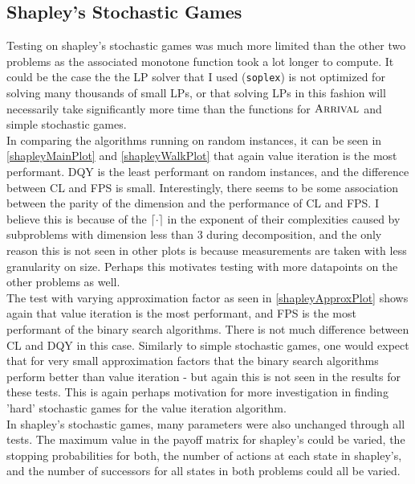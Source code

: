 \subsection{Shapley's Stochastic Games}
Testing on shapley's stochastic games was much more limited than the other two problems
as the associated monotone function took a lot longer to compute. It could be the case
the the LP solver that I used (\lstinline{soplex}\citep{soplex}) is not optimized for solving
many thousands of small LPs, or that solving LPs in this fashion will necessarily
take significantly more time than the functions for $\textsc{Arrival}$ and simple stochastic games. \\
In comparing the algorithms running on random instances, it can be seen in \cref{shapleyMainPlot}
and \cref{shapleyWalkPlot} that 
again value iteration is the most performant. DQY is the least performant on random instances, and the difference
between CL and FPS is small. Interestingly, there seems to be some association between
the parity of the dimension and the performance of CL and FPS. I believe this is because of the
$\lceil \cdot \rceil$ in the exponent of their complexities caused by
subproblems with dimension less than 3 during decomposition, and the only reason
 this is not seen in other plots is because measurements are taken with less granularity on size.
Perhaps this motivates testing with more datapoints on the other problems as well. \\
The test with varying approximation factor as seen in \cref{shapleyApproxPlot} shows
again that value iteration is the most performant, and FPS is the most performant of the binary search algorithms.
There is not much difference between CL and DQY in this case. Similarly to simple stochastic games,
one would expect that for very small approximation factors that the binary search algorithms
perform better than value iteration - but again this is not seen in the results for these tests. This is again
perhaps motivation for more investigation in finding 'hard' stochastic games for the value iteration algorithm. \\
In shapley's stochastic games, many parameters were also unchanged through all tests. The maximum value
in the payoff matrix for shapley's could be varied, the stopping probabilities for both,
the number of actions at each state in shapley's, and the number of successors for all states in both
problems could all be varied. 

